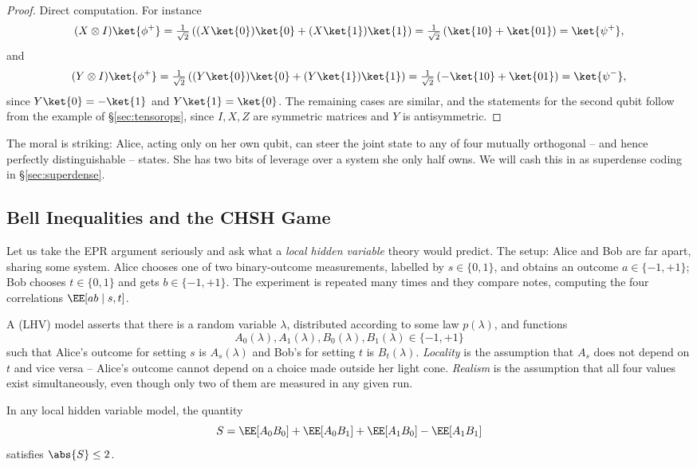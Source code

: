 \begin{proof}
	Direct computation. For instance
	$$(X\otimes I)\ket{\phi^+} = \tfrac{1}{\sqrt2}\left((X\ket{0})\ket{0} + (X\ket{1})\ket{1}\right) = \tfrac{1}{\sqrt2}\left(\ket{10}+\ket{01}\right) = \ket{\psi^+},$$
	and
	$$(Y\otimes I)\ket{\phi^+} = \tfrac1{\sqrt2}\left((Y\ket{0})\ket{0} + (Y\ket{1})\ket{1}\right) = \tfrac1{\sqrt2}\left(-\ket{10}+\ket{01}\right) = \ket{\psi^-},$$
	since $Y\ket{0} = -\ket{1}$ and $Y\ket{1} = \ket{0}$. The remaining cases are similar, and the statements for the second qubit follow from the example of \S\ref{sec:tensorops}, since $I,X,Z$ are symmetric matrices and $Y$ is antisymmetric.
\end{proof}

The moral is striking: Alice, acting only on her own qubit, can steer the joint state to any of four mutually orthogonal -- and hence perfectly distinguishable -- states. She has two bits of leverage over a system she only half owns. We will cash this in as superdense coding in \S\ref{sec:superdense}.

\subsection{Bell Inequalities and the CHSH Game}

Let us take the EPR argument seriously and ask what a \emph{local hidden variable} theory would predict. The setup: Alice and Bob are far apart, sharing some system. Alice chooses one of two binary-outcome measurements, labelled by $s \in \{0,1\}$, and obtains an outcome $a \in \{-1,+1\}$; Bob chooses $t \in \{0,1\}$ and gets $b \in \{-1,+1\}$. The experiment is repeated many times and they compare notes, computing the four correlations $\EE[ab \mid s,t]$.

A  (LHV) model asserts that there is a random variable $\lambda$, distributed according to some law $p(\lambda)$, and functions
$$A_0(\lambda), A_1(\lambda), B_0(\lambda), B_1(\lambda) \in \{-1,+1\}$$
such that Alice's outcome for setting $s$ is $A_s(\lambda)$ and Bob's for setting $t$ is $B_t(\lambda)$. \emph{Locality} is the assumption that $A_s$ does not depend on $t$ and vice versa -- Alice's outcome cannot depend on a choice made outside her light cone. \emph{Realism} is the assumption that all four values exist simultaneously, even though only two of them are measured in any given run.

\begin{theorem}
	In any local hidden variable model, the quantity
	$$S = \EE[A_0B_0] + \EE[A_0B_1] + \EE[A_1B_0] - \EE[A_1B_1]$$
	satisfies $\abs{S} \leq 2$.
\end{theorem}

